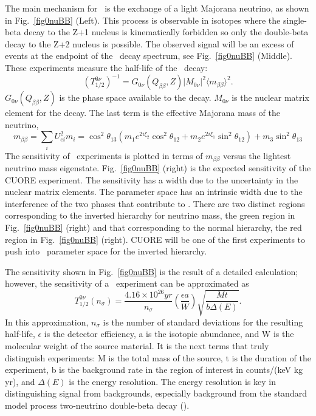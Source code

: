The main mechanism for \zeronu~is the exchange of a light Majorana neutrino, as shown in Fig.~\ref{fig0nuBB} (Left).  This process is observable in isotopes where the single-beta decay to the Z+1 nucleus is kinematically forbidden so only the double-beta decay to the Z+2 nucleus is possible. The observed signal will be an excess of events at the endpoint of the \twonu~decay spectrum, see Fig.~\ref{fig0nuBB} (Middle). These experiments measure the half-life of  the \zeronu~decay:
\begin{equation}
\label{half0nu}
(T_{1/2}^{0\nu})^{-1} = G_{0\nu}(Q_{\beta\beta}, Z) | M_{0\nu}|^{2} \langle m_{\beta\beta} \rangle^{2}.
\end{equation}
$G_{0\nu}(Q_{\beta\beta}, Z)$ is the phase space available to the decay. $M_{0\nu}$ is the nuclear matrix element  for the decay. The last term is the effective Majorana mass of the neutrino,
\begin{equation}
m_{\beta\beta}= \sum_{i} U^{2}_{e i} m_{i}=\cos^{2}\theta_{13} ( m_{1}e^{2i\xi_2}\cos^{2}\theta_{12} + m_{2}e^{2i\xi_{1}}\sin^{2}\theta_{12})+m_{3}\sin^{2}\theta_{13}
\end{equation}
The sensitivity of \zeronu~experiments is plotted in terms of $m_{\beta\beta}$ versus the lightest neutrino mass eigenstate. Fig.~\ref{fig0nuBB} (right) is the expected sensitivity of the CUORE experiment. The sensitivity has a width due to the uncertainty in the nuclear matrix elements. The parameter space has an intrinsic width due to the interference of the two phases that contribute to \zeronu. There are two distinct regions corresponding to the inverted hierarchy for neutrino mass, the green region in  Fig.~\ref{fig0nuBB} (right)  and that corresponding to the normal hierarchy, the red region in  Fig.~\ref{fig0nuBB} (right). CUORE will be one of the first experiments to push into \zeronu~parameter space for the inverted hierarchy.

The sensitivity shown in Fig.~\ref{fig0nuBB} is the result of a detailed calculation\cite{Alessandria:2011rc}; however,  the sensitivity of a \zeronu~experiment can be approximated as\cite{sens0nu}
\begin{equation}
\label{sens0nu}
T_{1/2}^{0\nu}(n_\sigma) = \frac{4.16\times 10^{26} yr}{n_\sigma} \left ( \frac{\epsilon a}{W} \right ) \sqrt{ \frac{Mt}{b\Delta(E)}}.
\end{equation}
In this approximation, $n_\sigma$ is the number of standard deviations for the resulting half-life, $\epsilon$ is the detector efficiency, a is the isotopic abundance, and W is the molecular weight of the source material. It is the next terms that truly distinguish experiments: M is the total mass of the source, t is the duration of the experiment, b is the background rate in the region of interest in counts/(keV kg yr), and $\Delta(E)$ is the energy resolution. The energy resolution is key in distinguishing signal from backgrounds, especially background from the standard model process two-neutrino double-beta decay  (\twonu). 

